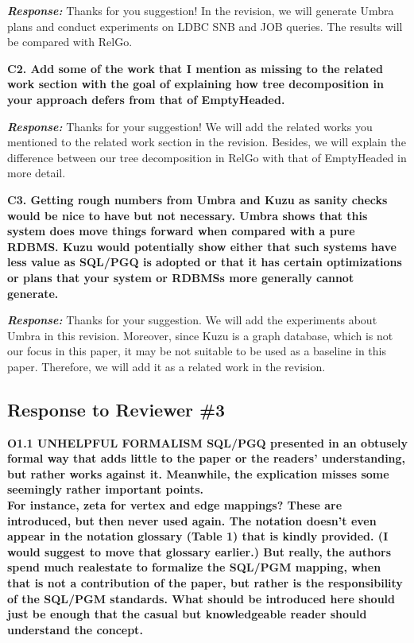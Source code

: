 \textbf{\textit{Response: }}
Thanks for you suggestion! In the revision, we will generate Umbra plans and conduct experiments on LDBC SNB and JOB queries. The results will be compared with RelGo.

\textbf{
C2. Add some of the work that I mention as missing to the related work section with the goal of explaining how tree decomposition in your approach defers from that of EmptyHeaded. }

\textbf{\textit{Response: }} Thanks for your suggestion! We will add the related works you mentioned to the related work section in the revision. Besides, we will explain the difference between our tree decomposition in RelGo with that of EmptyHeaded in more detail.


\textbf{
C3. Getting rough numbers from Umbra and Kuzu as sanity checks would be nice to have but not necessary. Umbra shows that this system does move things forward when compared with a pure RDBMS. Kuzu would potentially show either that such systems have less value as SQL/PGQ is adopted or that it has certain optimizations or plans that your system or RDBMSs more generally cannot generate. }

\textbf{\textit{Response: }}
Thanks for your suggestion. We will add the experiments about Umbra in this revision. Moreover, since Kuzu is a graph database, which is not our focus in this paper, it may be not suitable to be used as a baseline in this paper. Therefore, we will add it as a related work in the revision.


\subsection{Response to Reviewer \#3}

\textbf{
O1.1 UNHELPFUL FORMALISM
SQL/PGQ presented in an obtusely formal way that adds little to the paper or the readers' understanding, but rather works against it. 
Meanwhile, the explication misses some seemingly rather important points. \\
For instance, zeta for vertex and edge mappings? These are introduced, but then never used again. The notation doesn't even appear in the notation glossary (Table 1) that is kindly provided. (I would suggest to move that glossary earlier.) But really, the authors spend much realestate to formalize the SQL/PGM mapping, when that is not a contribution of the paper, but rather is the responsibility of the SQL/PGM standards. What should be introduced here should just be enough that the casual but knowledgeable reader should understand the concept.}

